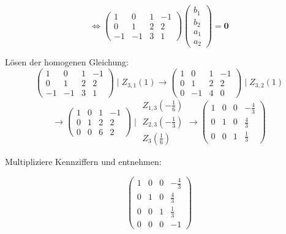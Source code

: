 \documentclass[a4paper,12pt]{article}
\begin{document}
\begin{enumerate}[label=\alph*)]
    \[
        \Longleftrightarrow
        \begin{pmatrix}1 & 0 & 1 & -1\\ 0 & 1 & 2 & 2\\ -1 & -1 & 3 & 1\end{pmatrix}
        \begin{pmatrix}b_1\\b_2\\a_1\\a_2\end{pmatrix} = \mathbf{0}
    \]

    Lösen der homogenen Gleichung:
    \[
        \begin{pmatrix}1 & 0 & 1 & -1\\ 0 & 1 & 2 & 2\\ -1 & -1 & 3 & 1\end{pmatrix}
        \;\Big|\; Z_{3,1}(1)
        \longrightarrow
        \begin{pmatrix}1 & 0 & 1 & -1\\ 0 & 1 & 2 & 2\\ 0 & -1 & 4 & 0\end{pmatrix}
        \;\Big|\; Z_{3,2}(1)
    \]
    \[
        \longrightarrow
        \begin{pmatrix}1 & 0 & 1 & -1\\ 0 & 1 & 2 & 2\\ 0 & 0 & 6 & 2\end{pmatrix}
        \;\Big|\;
        \begin{array}{l}
            Z_{1,3}\!\left(-\tfrac{1}{6}\right)\\[2pt]
            Z_{2,3}\!\left(-\tfrac{1}{3}\right)\\[2pt]
            Z_3\!\left(\tfrac{1}{6}\right)
        \end{array}
        \longrightarrow
        \begin{pmatrix}1 & 0 & 0 & -\tfrac{4}{3}\\[4pt] 0 & 1 & 0 & \tfrac{4}{3}\\[4pt] 0 & 0 & 1 & \tfrac{1}{3}\end{pmatrix}
    \]

    Multipliziere Kennziffern und entnehmen:

    \[
        \begin{pmatrix}1 & 0 & 0 & -\tfrac{4}{3}\\[4pt]
                        0 & 1 & 0 & \tfrac{4}{3}\\[4pt]
                        0 & 0 & 1 & \tfrac{1}{3}\\[4pt]
                        0 & 0 & 0 & -1\end{pmatrix}
    \]


\end{enumerate}
\end{document}
